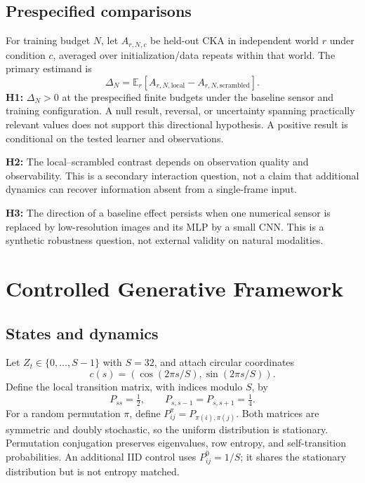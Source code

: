 \documentclass[11pt,a4paper]{article}
\newcommand{\E}{\mathbb{E}}
\begin{document}
\subsection{Prespecified comparisons}
For training budget $N$, let $A_{r,N,c}$ be held-out CKA in independent world $r$ under condition $c$, averaged over initialization/data repeats within that world. The primary estimand is
\begin{equation}
\Delta_N=\E_r[A_{r,N,\mathrm{local}}-A_{r,N,\mathrm{scrambled}}].
\end{equation}
\textbf{H1:} $\Delta_N>0$ at the prespecified finite budgets under the baseline sensor and training configuration. A null result, reversal, or uncertainty spanning practically relevant values does not support this directional hypothesis. A positive result is conditional on the tested learner and observations.

\textbf{H2:} The local--scrambled contrast depends on observation quality and observability. This is a secondary interaction question, not a claim that additional dynamics can recover information absent from a single-frame input.

\textbf{H3:} The direction of a baseline effect persists when one numerical sensor is replaced by low-resolution images and its MLP by a small CNN. This is a synthetic robustness question, not external validity on natural modalities.

\section{Controlled Generative Framework}
\subsection{States and dynamics}
Let $Z_t\in\{0,\ldots,S-1\}$ with $S=32$, and attach circular coordinates
\begin{equation}
c(s)=(\cos(2\pi s/S),\sin(2\pi s/S)).
\end{equation}
Define the local transition matrix, with indices modulo $S$, by
\begin{equation}
P_{ss}=\tfrac12,\qquad P_{s,s-1}=P_{s,s+1}=\tfrac14.
\end{equation}
For a random permutation $\pi$, define $P^{\pi}_{ij}=P_{\pi(i),\pi(j)}$. Both matrices are symmetric and doubly stochastic, so the uniform distribution is stationary. Permutation conjugation preserves eigenvalues, row entropy, and self-transition probabilities. An additional IID control uses $P^0_{ij}=1/S$; it shares the stationary distribution but is not entropy matched.
\end{document}
